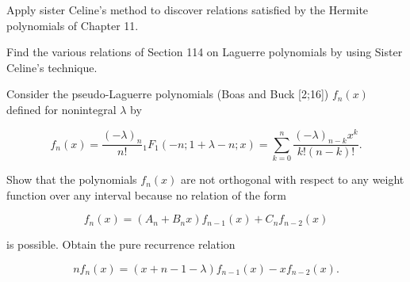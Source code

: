 \begin{problem}\label{problem10chapter14}
Apply sister Celine's method to discover relations satisfied by the Hermite polynomials of Chapter 11.
\end{problem}
\begin{solution}

\end{solution}
\begin{problem}\label{problem11chapter14}
Find the various relations of Section 114 on Laguerre polynomials by using Sister Celine's technique.
\end{problem}
\begin{solution}

\end{solution}
\begin{problem}\label{problem12chapter14}
Consider the pseudo-Laguerre polynomials (Boas and Buck [2;16]) $f_n(x)$ defined for nonintegral $\lambda$ by

$$f_n(x) = \dfrac{(-\lambda)_n}{n!} {}_1F_1(-n;1+\lambda-n;x) = \displaystyle\sum_{k=0}^n \dfrac{(-\lambda)_{n-k} x^k}{k! (n-k)!}.$$

Show that the polynomials $f_n(x)$ are not orthogonal with respect to any weight function over any interval because no relation of the form

$$f_n(x) = (A_n + B_n x) f_{n-1}(x) + C_n f_{n-2}(x)$$

is possible. Obtain the pure recurrence relation

$$nf_n(x) = (x+n-1-\lambda)f_{n-1}(x) - xf_{n-2}(x).$$
\end{problem}
